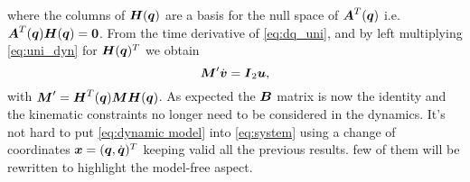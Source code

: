 where the columns of $\boldsymbol{H}({\boldsymbol{q}})$ are a basis for the null space of $\boldsymbol{A}^T({\boldsymbol{q}})$ i.e.  $\boldsymbol{A}^T({\boldsymbol{q}})\boldsymbol{H}({\boldsymbol{q}})=\boldsymbol{0}$. 
From the time derivative of \eqref{eq:dq_uni}, and by left multiplying \eqref{eq:uni_dyn} for $\boldsymbol{H}({\boldsymbol{q}})^T$ we obtain
\begin{equation}\label{eq:uni_dynamic}
    \boldsymbol{M}' \dot{\boldsymbol{v}} = \boldsymbol{I}_2\boldsymbol{u},
\end{equation}
with $\boldsymbol{M}' = \boldsymbol{H}^T({\boldsymbol{q}}) \boldsymbol{M} \boldsymbol{H}({\boldsymbol{q}})$. As expected the $\boldsymbol{B}$ matrix is now the identity and the kinematic constraints no longer need to be considered in the dynamics.
It's not hard to put \eqref{eq:dynamic model} into \eqref{eq:system} using a change of coordinates $\boldsymbol{x} = ({\boldsymbol{q}}, \dot{\boldsymbol{q}})^T$ keeping valid all the previous results. few of them will be rewritten to highlight the model-free aspect.

